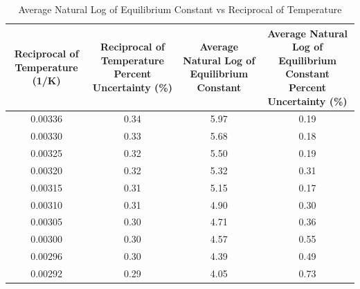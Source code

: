 \begin{table}[H]
\centering
\begin{tabular}{|c|c|c|c|}
\hline
\multicolumn{1}{|C{2.5cm}|}{Reciprocal   of Temperature (1/K)} & \multicolumn{1}{|C{4cm}|}{Reciprocal of   Temperature Percent Uncertainty (\%)} & \multicolumn{1}{|C{3.5cm}|}{Average Natural   Log of Equilibrium Constant} & \multicolumn{1}{|C{5cm}|}{Average Natural   Log of Equilibrium Constant Percent Uncertainty (\%)} \\ \hline
0.00336                           & 0.34                                                 & 5.97                                          & 0.19                                                                   \\ \hline
0.00330                           & 0.33                                                 & 5.68                                          & 0.18                                                                   \\ \hline
0.00325                           & 0.32                                                 & 5.50                                          & 0.19                                                                   \\ \hline
0.00320                           & 0.32                                                 & 5.32                                          & 0.31                                                                   \\ \hline
0.00315                           & 0.31                                                 & 5.15                                          & 0.17                                                                   \\ \hline
0.00310                           & 0.31                                                 & 4.90                                          & 0.30                                                                   \\ \hline
0.00305                           & 0.30                                                 & 4.71                                          & 0.36                                                                   \\ \hline
0.00300                           & 0.30                                                 & 4.57                                          & 0.55                                                                   \\ \hline
0.00296                           & 0.30                                                 & 4.39                                          & 0.49                                                                   \\ \hline
0.00292                           & 0.29                                                 & 4.05                                          & 0.73                                                                   \\ \hline
\end{tabular}
\caption{Average Natural Log of Equilibrium Constant vs Reciprocal of Temperature}
\label{table:after_linearization_avg}
\end{table}

